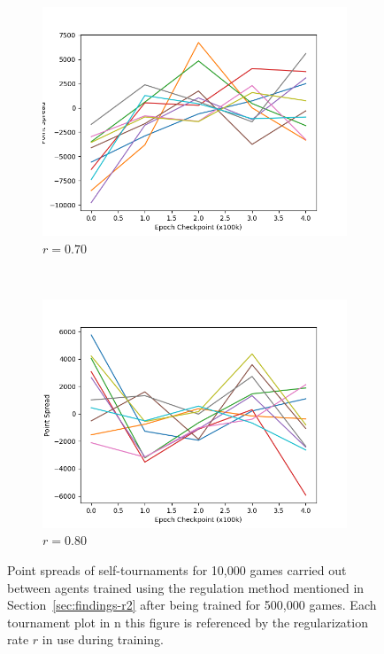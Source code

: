 \begin{figure}
	\begin{subfigure}[t]{0.48\textwidth}
		\center
		\includegraphics[width=\textwidth]{images/findings/experiments/regularization/tourny/reg_070-kyttuhat-strict-500k.png}
		\caption{$r = 0.70$}
	\end{subfigure}
	~
	\begin{subfigure}[t]{0.48\textwidth}
		\center
		\includegraphics[width=\textwidth]{images/findings/experiments/regularization/tourny/reg_080-kyttuhat-strict-500k.png}
		\caption{$r = 0.80$}
	\end{subfigure}

\caption{
	Point spreads of self-tournaments for 10,000 games
	carried out between agents trained using
	the regulation method mentioned in Section~\ref{sec:findings-r2} after being
	trained for 500,000 games.
	Each tournament plot in n this figure is referenced by the regularization
	rate $r$ in use during training.
}
\label{fig:reg-tournies}
\end{figure}
